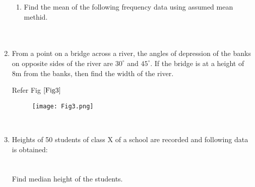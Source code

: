 \begin{enumerate}[\arabic*]
\begin{enumerate}
    \item Find the mean of the following frequency data using assumed mean methid. \\
     \vspace{2mm}\\
     \vspace{5mm} \\  
      
\end{enumerate}
    
\item From a point on a bridge across a river, the angles of depression of the banks on opposite sides of the river are $30^\circ$ and $45^\circ$. If the bridge is at a height of 8m from the banks, then find the width of the river.
    
    Refer Fig $\ref{Fig3}$
    
    
    \begin{figure}[h!]
        \centering
        \texttt{[image: Fig3.png]}
    	\caption{}
    	\label{Fig3}
     \end{figure}
     \vspace{5mm}\\
     
      
\item Heights of 50 students of class X of a school are recorded and following data is obtained:\\
     \vspace{2mm}\\
     \vspace{3mm} \\
     Find median height of the students.
     \vspace{2mm} \\
     

\end{enumerate}
